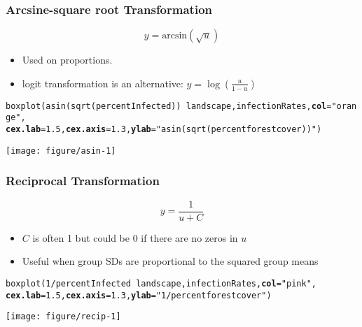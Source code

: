 \documentclass[color=usenames,dvipsnames]{beamer}\usepackage[]{graphicx}\usepackage[]{color}
\makeatletter
\newcommand{\hlnum}[1]{\textcolor[rgb]{0.69,0.494,0}{#1}}%
\newcommand{\hlstr}[1]{\textcolor[rgb]{0.749,0.012,0.012}{#1}}%
\newcommand{\hlopt}[1]{\textcolor[rgb]{0,0,0}{#1}}%
\newcommand{\hlstd}[1]{\textcolor[rgb]{0,0,0}{#1}}%
\newcommand{\hlkwc}[1]{\textcolor[rgb]{0,0,0}{\textbf{#1}}}%
\newcommand{\hlkwd}[1]{\textcolor[rgb]{0.004,0.004,0.506}{#1}}%
\newenvironment{kframe}{%
 \def\at@end@of@kframe{}%
 \ifinner\ifhmode%
  \def\at@end@of@kframe{\end{minipage}}%
  \begin{minipage}{\columnwidth}%
 \fi\fi%
 \def\FrameCommand##1{\hskip\@totalleftmargin \hskip-\fboxsep
 \colorbox{shadecolor}{##1}\hskip-\fboxsep
     \hskip-\linewidth \hskip-\@totalleftmargin \hskip\columnwidth}%
 \MakeFramed {\advance\hsize-\width
   \@totalleftmargin\z@ \linewidth\hsize
   \@setminipage}}%
 {\par\unskip\endMakeFramed%
 \at@end@of@kframe}
\newenvironment{knitrout}{}{} %
\makeatother
\begin{document}
\begin{frame}[fragile]
  \frametitle{Arcsine-square root Transformation}
  \[
  y = \mathrm{arcsin}(\sqrt{u})
  \]
  \begin{itemize}%
    \small
    \item Used on proportions.
    \item logit transformation is an alternative: $y = \log(\frac{u}{1-u})$
  \end{itemize}
  \pause
\begin{knitrout}\scriptsize
{}\color{fgcolor}\begin{kframe}
\begin{alltt}
\hlkwd{boxplot}\hlstd{(}\hlkwd{asin}\hlstd{(}\hlkwd{sqrt}\hlstd{(percentInfected))}\hlopt{~}\hlstd{landscape, infectionRates,} \hlkwc{col}\hlstd{=}\hlstr{"orange"}\hlstd{,}
        \hlkwc{cex.lab}\hlstd{=}\hlnum{1.5}\hlstd{,} \hlkwc{cex.axis}\hlstd{=}\hlnum{1.3}\hlstd{,} \hlkwc{ylab}\hlstd{=}\hlstr{"asin(sqrt(percent forest cover))"}\hlstd{)}
\end{alltt}
\end{kframe}

{\centering \texttt{[image: figure/asin-1]} 

}



\end{knitrout}
\end{frame}




\begin{frame}[fragile]
  \frametitle{Reciprocal Transformation}
  \[
  y = \frac{1}{u + C}
  \]
  \begin{itemize}%
    \small
    \item $C$ is often 1 but could be 0 if there are no zeros in $u$
    \item Useful when group SDs are proportional to the squared group means
  \end{itemize}
  \pause
\begin{knitrout}\scriptsize
{}\color{fgcolor}\begin{kframe}
\begin{alltt}
\hlkwd{boxplot}\hlstd{(}\hlnum{1}\hlopt{/}\hlstd{percentInfected}\hlopt{~}\hlstd{landscape, infectionRates,} \hlkwc{col}\hlstd{=}\hlstr{"pink"}\hlstd{,}
        \hlkwc{cex.lab}\hlstd{=}\hlnum{1.5}\hlstd{,} \hlkwc{cex.axis}\hlstd{=}\hlnum{1.3}\hlstd{,} \hlkwc{ylab}\hlstd{=}\hlstr{"1/percent forest cover"}\hlstd{)}
\end{alltt}
\end{kframe}

{\centering \texttt{[image: figure/recip-1]} 

}



\end{knitrout}
\end{frame}
\end{document}
